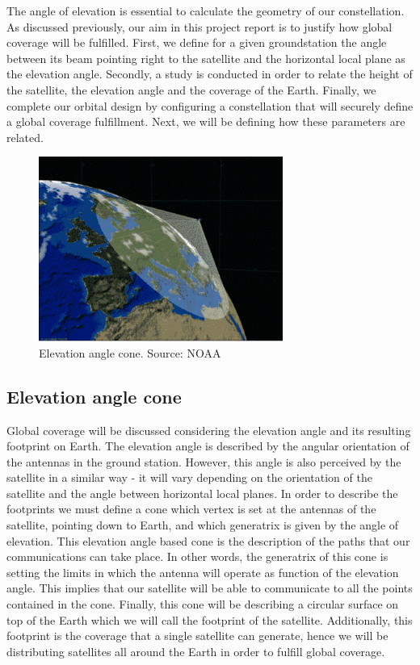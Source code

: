 The angle of elevation is essential to calculate the geometry of our constellation. As discussed previously, our aim in this project report is to justify how global coverage will be fulfilled. First, we define for a given groundstation the angle between its beam pointing right to the satellite and the horizontal local plane as the elevation angle. Secondly, a study is conducted in order to relate the height of the satellite, the elevation angle and the coverage of the Earth. Finally, we complete our orbital design by configuring a constellation that will securely define a global coverage fulfillment. Next, we will be defining how these parameters are related. 

\begin{figure}[H]
\includegraphics[width=8cm]{noaa}
\centering
\caption[Elevation angle cone]{Elevation angle cone. Source: NOAA}
\end{figure}

\subsection{Elevation angle cone}
Global coverage will be discussed considering the elevation angle and its resulting footprint on Earth. The elevation angle is described by the angular orientation of the antennas in the ground station. However, this angle is also perceived by the satellite in a similar way - it will vary depending on the orientation of the satellite and the angle between horizontal local planes. In order to describe the footprints we must define a cone which vertex is set at the antennas of the satellite, pointing down to Earth, and which generatrix is given by the angle of elevation. This elevation angle based cone is the description of the paths that our communications can take place. In other words, the generatrix of this cone is setting the limits in which the antenna will operate as function of the elevation angle. This implies that our satellite will be able to communicate to all the points contained in the cone. Finally, this cone will be describing a circular surface on top of the Earth which we will call the footprint of the satellite. Additionally, this footprint is the coverage that a single satellite can generate, hence we will be distributing satellites all around the Earth in order to fulfill global coverage. 

